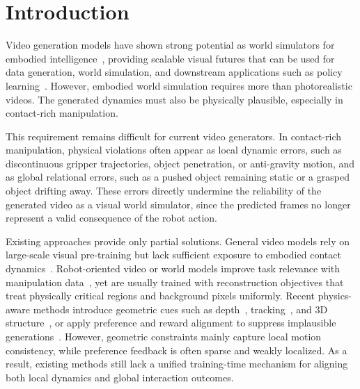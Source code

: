 \section{Introduction}

Video generation models have shown strong potential as world simulators for embodied intelligence~\cite{openai2024sora,GoogleDeepMind2025Veo3,wan2025wan,kong2024hunyuanvideo,yang2024cogvideox}, providing scalable visual futures that can be used for data generation, world simulation, and downstream applications such as policy learning~\cite{bruce2024genie,o2024open,nvidia2026worldsimulationvideofoundation,ye2026worldactionmodelszeroshot,li2025unified,liang2025video, lingbot-va2026}. However, embodied world simulation requires more than photorealistic videos. The generated dynamics must also be physically plausible, especially in contact-rich manipulation.

This requirement remains difficult for current video generators. In contact-rich manipulation, physical violations often appear as local dynamic errors, such as discontinuous gripper trajectories, object penetration, or anti-gravity motion, and as global relational errors, such as a pushed object remaining static or a grasped object drifting away. These errors directly undermine the reliability of the generated video as a visual world simulator, since the predicted frames no longer represent a valid consequence of the robot action.

Existing approaches provide only partial solutions. General video models rely on large-scale visual pre-training but lack sufficient exposure to embodied contact dynamics~\cite{GoogleDeepMind2025Veo3,wan2025wan,kong2024hunyuanvideo,yang2024cogvideox}. Robot-oriented video or world models improve task relevance with manipulation data~\cite{jang2025dreamgen,feng2025vidar,cheang2024gr,du2023learning, chen2025lvp}, yet are usually trained with reconstruction objectives that treat physically critical regions and background pixels uniformly. Recent physics-aware methods introduce geometric cues such as depth~\cite{yang2024depth, video_depth_anything}, tracking~\cite{karaev2023cotracker,karaev24cotracker3,harley2025alltracker}, and 3D structure~\cite{zhen2025tesseract,shang2025roboscape,zhou2024robodreamer,guo2025ctrl}, or apply preference and reward alignment to suppress implausible generations~\cite{ouyang2022training,rafailov2024direct,ali2025abot,zhang2026mind}. However, geometric constraints mainly capture local motion consistency, while preference feedback is often sparse and weakly localized. As a result, existing methods still lack a unified training-time mechanism for aligning both local dynamics and global interaction outcomes.

